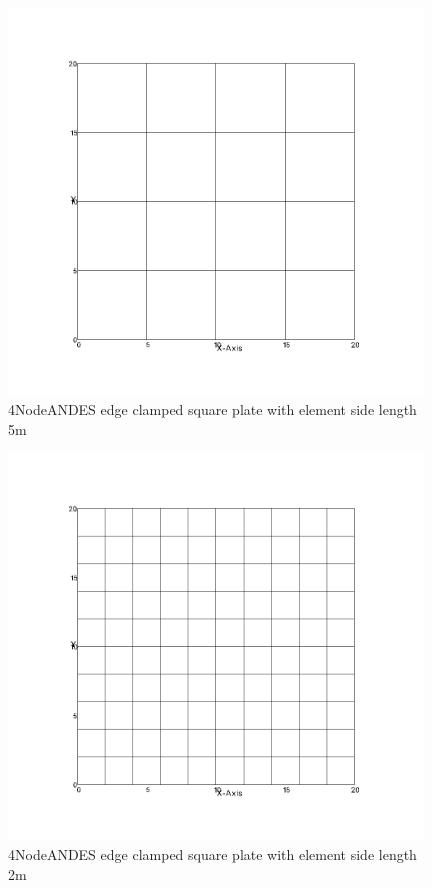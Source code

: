 \documentclass[fleqn,11pt,letter]{article}
\begin{document}
\newpage

\begin{figure}[H]
  \centering
  \includegraphics[width=11cm]{../Figure_files/4NodeANDES/square_plate2.png}
  \caption{4NodeANDES edge clamped square plate with element side length 5m }
  \label{fig 4NodeANDES edges clamped square plate with element side length 5m }
\end{figure}


\begin{figure}[H]
  \centering
  \includegraphics[width=11cm]{../Figure_files/4NodeANDES/square_plate3.png}
  \caption{4NodeANDES edge clamped square plate with element side length 2m }
  \label{fig 4NodeANDES edges clamped square plate with element side length 2m }
\end{figure}
\end{document}

